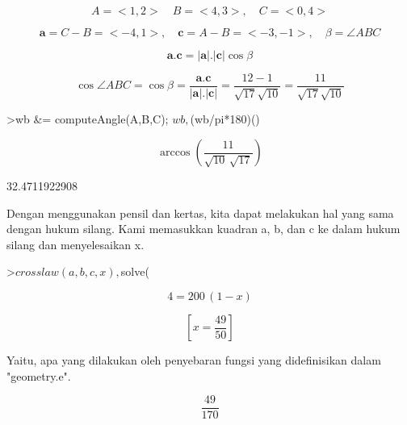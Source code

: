 \documentclass[a4paper,10pt]{article}
\begin{document}
\begin{eulernotebook}
\begin{eulercomment}
\begin{eulercomment}
\begin{eulercomment}
\end{eulercomment}
\begin{eulerformula}
\[
A=<1,2>\quad B=<4,3>,\quad C=<0,4>
\]
\end{eulerformula}
\begin{eulerformula}
\[
\mathbf{a}=C-B=<-4,1>,\quad \mathbf{c}=A-B=<-3,-1>,\quad \beta=\angle ABC
\]
\end{eulerformula}
\begin{eulerformula}
\[
\mathbf{a}.\mathbf{c}=|\mathbf{a}|.|\mathbf{c}|\cos \beta
\]
\end{eulerformula}
\begin{eulerformula}
\[
\cos \angle ABC =\cos\beta=\frac{\mathbf{a}.\mathbf{c}}{|\mathbf{a}|.|\mathbf{c}|}=\frac{12-1}{\sqrt{17}\sqrt{10}}=\frac{11}{\sqrt{17}\sqrt{10}}
\]
\end{eulerformula}
\begin{eulerprompt}
>wb &= computeAngle(A,B,C); $wb, $(wb/pi*180)()
\end{eulerprompt}
\begin{eulerformula}
\[
\arccos \left(\frac{11}{\sqrt{10}\,\sqrt{17}}\right)
\]
\end{eulerformula}
\begin{euleroutput}
  32.4711922908
\end{euleroutput}
\begin{eulercomment}
Dengan menggunakan pensil dan kertas, kita dapat melakukan hal yang
sama dengan hukum silang. Kami memasukkan kuadran a, b, dan c ke dalam
hukum silang dan menyelesaikan x.
\end{eulercomment}
\begin{eulerprompt}
>$crosslaw(a,b,c,x), $solve(%
\end{eulerprompt}
\begin{eulerformula}
\[
4=200\,\left(1-x\right)
\]
\end{eulerformula}
\begin{eulerformula}
\[
\left[ x=\frac{49}{50} \right] 
\]
\end{eulerformula}
\begin{eulercomment}
Yaitu, apa yang dilakukan oleh penyebaran fungsi yang didefinisikan
dalam "geometry.e".
\end{eulercomment}
\begin{eulerformula}
\[
\frac{49}{170}
\]
\end{eulerformula}

\end{eulercomment}
\end{eulercomment}
\end{eulernotebook}
\end{document}
